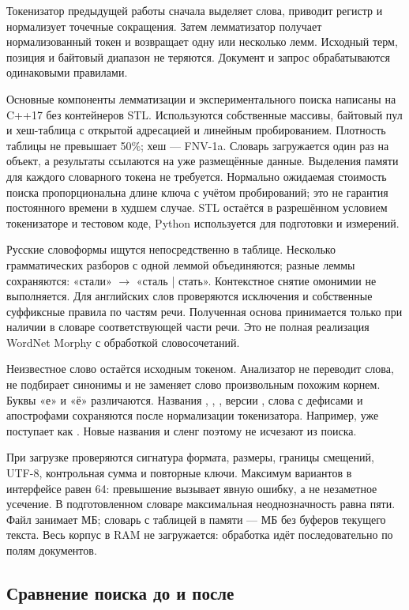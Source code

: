 \documentclass[12pt,a4paper]{article}
\newcommand{\code}[1]{\texttt{\detokenize{#1}}}
\begin{document}
Токенизатор предыдущей работы сначала выделяет слова, приводит регистр
и нормализует точечные сокращения. Затем лемматизатор получает нормализованный
токен и возвращает одну или несколько лемм. Исходный терм, позиция и байтовый
диапазон не теряются. Документ и запрос обрабатываются одинаковыми правилами.

Основные компоненты лемматизации и экспериментального поиска написаны
на C++17 без контейнеров STL. Используются собственные массивы, байтовый пул
и хеш-таблица с открытой адресацией и линейным пробированием. Плотность таблицы
не превышает 50\%; хеш --- FNV-1a. Словарь загружается один раз на объект,
а результаты ссылаются на уже размещённые данные. Выделения памяти для каждого
словарного токена не требуется. Нормально ожидаемая стоимость поиска
пропорциональна длине ключа с учётом пробирований; это не гарантия постоянного
времени в худшем случае. STL остаётся в разрешённом условием токенизаторе
и тестовом коде, Python используется для подготовки и измерений.

Русские словоформы ищутся непосредственно в таблице. Несколько грамматических
разборов с одной леммой объединяются; разные леммы сохраняются:
«стали» $\rightarrow$ «сталь | стать». Контекстное снятие омонимии не выполняется.
Для английских слов проверяются исключения и собственные суффиксные правила
по частям речи. Полученная основа принимается только при наличии в словаре
соответствующей части речи. Это не полная реализация WordNet Morphy
с обработкой словосочетаний.

Неизвестное слово остаётся исходным токеном. Анализатор не переводит слова,
не подбирает синонимы и не заменяет слово произвольным похожим корнем.
Буквы «е» и «ё» различаются. Названия \code{PS5}, \code{C++}, \code{C#},
версии \code{3.0.1}, слова с дефисами и апострофами сохраняются после
нормализации токенизатора. Например, \code{S.T.A.L.K.E.R.} уже поступает
как \code{stalker}. Новые названия и сленг поэтому не исчезают из поиска.

При загрузке проверяются сигнатура формата, размеры, границы смещений,
UTF-8, контрольная сумма и повторные ключи. Максимум вариантов в интерфейсе
равен 64: превышение вызывает явную ошибку, а не незаметное усечение.
В подготовленном словаре максимальная неоднозначность равна пяти.
Файл занимает \DictionaryMB{} МБ; словарь с таблицей в памяти ---
\DictionaryMemoryMB{} МБ без буферов текущего текста. Весь корпус в RAM
не загружается: обработка идёт последовательно по полям документов.

\subsection{Сравнение поиска до и после}
\end{document}
